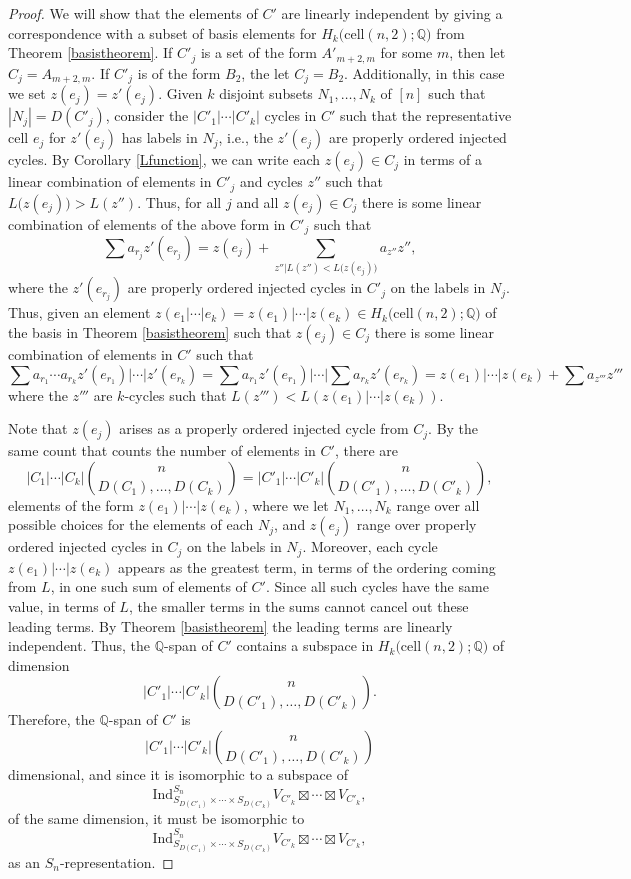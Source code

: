 \documentclass[12py]{amsart}%
\theoremstyle{definition}\newtheorem{definition}[thm]{Definition}
\theoremstyle{definition}
\newcommand{\Q}{\ensuremath{\mathbb{Q}}}
\begin{document}
\begin{proof}
We will show that the elements of $C'$ are linearly independent by giving a correspondence with a subset of basis elements for $H_{k}\big(\text{cell}(n,2);\Q\big)$ from Theorem \ref{basistheorem}. If $C'_{j}$ is a set of the form $A'_{m+2,m}$ for some $m$, then let $C_{j}=A_{m+2,m}$. If $C'_{j}$ is of the form $B_{2}$, the let $C_{j}=B_{2}$. Additionally, in this case we set $z(e_{j})=z'(e_{j})$. Given $k$ disjoint subsets $N_{1},\dots, N_{k}$ of $[n]$ such that $|N_{j}|=D(C'_{j})$, consider the $|C'_{1}|\cdots|C'_{k}|$ cycles in $C'$ such that the representative cell $e_{j}$ for $z'(e_{j})$ has labels in $N_{j}$, i.e., the $z'(e_{j})$ are properly ordered injected cycles. By Corollary \ref{Lfunction}, we can write each $z(e_{j})\in C_{j}$ in terms of a linear combination of elements in $C'_{j}$ and cycles $z''$ such that $L\big(z(e_{j})\big)>L(z'')$. Thus, for all $j$ and all $z(e_{j})\in C_{j}$ there is some linear combination of elements of the above form in $C'_{j}$ such that
\[
\sum a_{r_{j}}z'(e_{r_{j}})=z(e_{j})+\sum_{z''|L(z'')<L\big(z(e_{j})\big)}a_{z''}z'',
\]
where the $z'(e_{r_{j}})$ are properly ordered injected cycles in $C'_{j}$ on the labels in $N_{j}$. Thus, given an element $z(e_{1}|\cdots|e_{k})=z(e_{1})|\cdots|z(e_{k})\in H_{k}\big(\text{cell}(n,2);\Q\big)$ of the basis in Theorem \ref{basistheorem} such that $z(e_{j})\in C_{j}$ there is some linear combination of elements in $C'$ such that
\[
\sum a_{r_{1}}\cdots a_{r_{k}}z'(e_{r_{1}})|\cdots|z'(e_{r_{k}})=\sum a_{r_{1}}z'(e_{r_{1}})|\cdots|\sum a_{r_{k}}z'(e_{r_{k}})=z(e_{1})|\cdots|z(e_{k})+\sum a_{z'''}z'''
\]
where the $z'''$ are $k$-cycles such that $L(z''')<L(z(e_{1})|\cdots|z(e_{k}))$.

Note that $z(e_{j})$ arises as a properly ordered injected cycle from $C_{j}$. By the same count that counts the number of elements in $C'$, there are
\[
|C_{1}|\cdots|C_{k}|\binom{n}{D(C_{1}),\dots, D(C_{k})}=|C'_{1}|\cdots|C'_{k}|\binom{n}{D(C'_{1}),\dots, D(C'_{k})},
\]
elements of the form $z(e_{1})|\cdots|z(e_{k})$, where we let $N_{1},\dots, N_{k}$ range over all possible choices for the elements of each $N_{j}$, and $z(e_{j})$ range over properly ordered injected cycles in $C_{j}$ on the labels in $N_{j}$. Moreover, each cycle $z(e_{1})|\cdots|z(e_{k})$ appears as the greatest term, in terms of the ordering coming from $L$, in one such sum of elements of $C'$. Since all such cycles have the same value, in terms of $L$, the smaller terms in the sums cannot cancel out these leading terms. By Theorem \ref{basistheorem} the leading terms are linearly independent. Thus, the $\Q$-span of $C'$ contains a subspace in $H_{k}\big(\text{cell}(n,2);\Q\big)$ of dimension
\[
|C'_{1}|\cdots|C'_{k}|\binom{n}{D(C'_{1}),\dots, D(C'_{k})}.
\]
Therefore, the $\Q$-span of $C'$ is
\[
|C'_{1}|\cdots|C'_{k}|\binom{n}{D(C'_{1}),\dots, D(C'_{k})}
\] 
dimensional, and since it is isomorphic to a subspace of 
\[
\text{Ind}^{S_{n}}_{S_{D(C'_{1})}\times \cdots \times S_{D(C'_{k})}}V_{C'_{k}}\boxtimes\cdots \boxtimes V_{C'_{k}},
\]
of the same dimension, it must be isomorphic to
\[
\text{Ind}^{S_{n}}_{S_{D(C'_{1})}\times \cdots \times S_{D(C'_{k})}}V_{C'_{k}}\boxtimes\cdots \boxtimes V_{C'_{k}},
\]
as an $S_{n}$-representation.


\end{proof}
\end{document}
